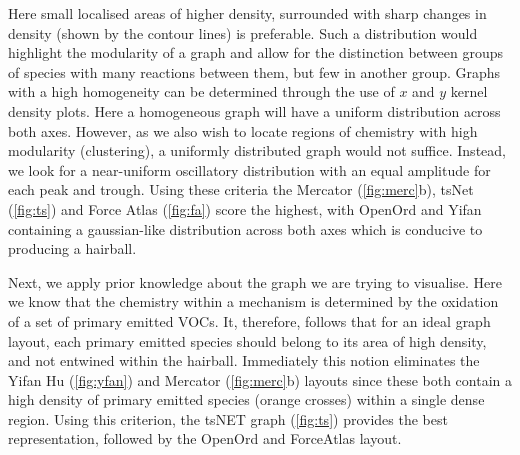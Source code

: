Here small localised areas of higher density, surrounded with sharp changes in density (shown by the contour lines) is preferable. Such a distribution would highlight the modularity of a graph and allow for the distinction between groups of species with many reactions between them, but few in another group. Graphs with a high homogeneity can be determined through the use of $x$ and $y$ kernel density plots. Here a homogeneous graph will have a uniform distribution across both axes. However, as we also wish to locate regions of chemistry with high modularity (clustering), a uniformly distributed graph would not suffice. Instead, we look for a near-uniform oscillatory distribution with an equal amplitude for each peak and trough. Using these criteria the Mercator (\autoref{fig:merc}b), tsNet (\autoref{fig:ts}) and Force Atlas (\autoref{fig:fa}) score the highest, with OpenOrd and Yifan containing a gaussian-like distribution across both axes which is conducive to producing a hairball. 

Next, we apply prior knowledge about the graph we are trying to visualise. Here we know that the chemistry within a mechanism is determined by the oxidation of a set of primary emitted VOCs. It, therefore, follows that for an ideal graph layout, each primary emitted species should belong to its area of high density, and not entwined within the hairball. Immediately this notion eliminates the Yifan Hu (\autoref{fig:yfan}) and Mercator (\autoref{fig:merc}b) layouts since these both contain a high density of primary emitted species (orange crosses) within a single dense region. Using this criterion, the tsNET graph (\autoref{fig:ts}) provides the best representation, followed by the OpenOrd and ForceAtlas layout. 







